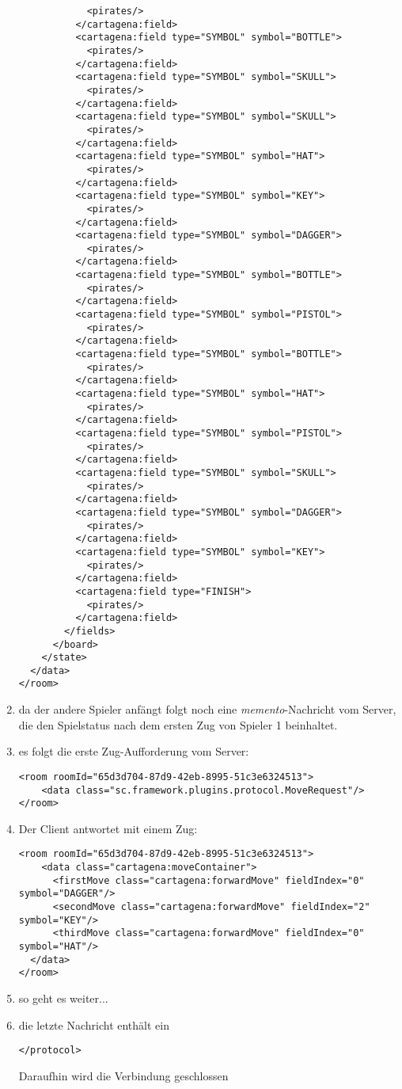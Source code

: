 \documentclass[12pt,a4paper, ngerman, oneside]{scrartcl}
\begin{document}
\begin{enumerate}
\begin{verbatim}
            <pirates/>
          </cartagena:field>
          <cartagena:field type="SYMBOL" symbol="BOTTLE">
            <pirates/>
          </cartagena:field>
          <cartagena:field type="SYMBOL" symbol="SKULL">
            <pirates/>
          </cartagena:field>
          <cartagena:field type="SYMBOL" symbol="SKULL">
            <pirates/>
          </cartagena:field>
          <cartagena:field type="SYMBOL" symbol="HAT">
            <pirates/>
          </cartagena:field>
          <cartagena:field type="SYMBOL" symbol="KEY">
            <pirates/>
          </cartagena:field>
          <cartagena:field type="SYMBOL" symbol="DAGGER">
            <pirates/>
          </cartagena:field>
          <cartagena:field type="SYMBOL" symbol="BOTTLE">
            <pirates/>
          </cartagena:field>
          <cartagena:field type="SYMBOL" symbol="PISTOL">
            <pirates/>
          </cartagena:field>
          <cartagena:field type="SYMBOL" symbol="BOTTLE">
            <pirates/>
          </cartagena:field>
          <cartagena:field type="SYMBOL" symbol="HAT">
            <pirates/>
          </cartagena:field>
          <cartagena:field type="SYMBOL" symbol="PISTOL">
            <pirates/>
          </cartagena:field>
          <cartagena:field type="SYMBOL" symbol="SKULL">
            <pirates/>
          </cartagena:field>
          <cartagena:field type="SYMBOL" symbol="DAGGER">
            <pirates/>
          </cartagena:field>
          <cartagena:field type="SYMBOL" symbol="KEY">
            <pirates/>
          </cartagena:field>
          <cartagena:field type="FINISH">
            <pirates/>
          </cartagena:field>
        </fields>
      </board>
    </state>
  </data>
</room>
\end{verbatim}
\item da der andere Spieler anfängt folgt noch eine \textit{memento}-Nachricht vom Server, die den Spielstatus nach dem ersten Zug von Spieler 1 beinhaltet.
\item es folgt die erste Zug-Aufforderung vom Server: \begin{verbatim}
<room roomId="65d3d704-87d9-42eb-8995-51c3e6324513">
    <data class="sc.framework.plugins.protocol.MoveRequest"/>
</room>
\end{verbatim}
\item Der Client antwortet mit einem Zug: \begin{verbatim}
<room roomId="65d3d704-87d9-42eb-8995-51c3e6324513">
    <data class="cartagena:moveContainer">
      <firstMove class="cartagena:forwardMove" fieldIndex="0" symbol="DAGGER"/>
      <secondMove class="cartagena:forwardMove" fieldIndex="2" symbol="KEY"/>
      <thirdMove class="cartagena:forwardMove" fieldIndex="0" symbol="HAT"/>
  </data>
</room>
\end{verbatim}
\item so geht es weiter...
\item die letzte Nachricht enthält ein \begin{verbatim}
</protocol>
\end{verbatim}
Daraufhin wird die Verbindung geschlossen
\end{enumerate}
\end{document}
